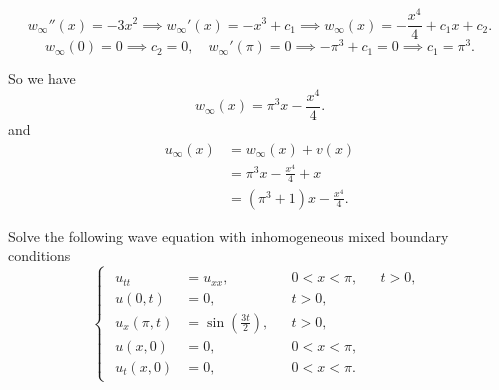 \documentclass[plain]{pset}
\begin{document}
\begin{solution}
    \[w_\infty''(x) = -3x^2 \implies w_\infty'(x) = -x^3 + c_1 \implies w_\infty(x) = -\frac{x^4}{4} + c_1x + c_2.\]
    \[w_\infty(0) = 0 \implies c_2 = 0, \quad w_\infty'(\pi) = 0 \implies -\pi^3 + c_1 = 0 \implies c_1 = \pi^3.\]

    So we have
    \[w_\infty(x) = \pi^3x - \frac{x^4}{4}.\]
    and
    \begin{align*}
        u_\infty(x) & = w_\infty(x) + v(x)                       \\
                    & = \pi^3x - \frac{x^4}{4} + x               \\
                    & = \left(\pi^3 + 1\right)x - \frac{x^4}{4}.
    \end{align*}
\end{solution}

\pagebreak

\begin{problem}
Solve the following wave equation with inhomogeneous mixed boundary conditions
\[
    \begin{cases}
        \begin{aligned}
            u_{tt}      & = u_{xx},                        &  & 0 < x < \pi, &  & t > 0, \\
            u(0, t)     & = 0,                             &  & t > 0,                   \\
            u_x(\pi, t) & = \sin\left(\frac{3t}{2}\right), &  & t > 0,                   \\
            u(x, 0)     & = 0,                             &  & 0 < x < \pi,             \\
            u_t(x, 0)   & = 0,                             &  & 0 < x < \pi.
        \end{aligned}
    \end{cases}
\]
\end{problem}
\begin{solution}

\end{solution}
\end{document}
